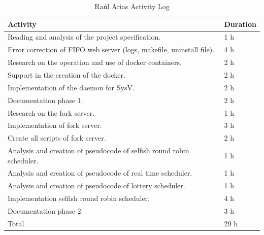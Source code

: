 \documentclass{article}
\begin{document}
\begin{table}[H]
\centering
\caption{Raúl Arias Activity Log}
\begin{tabular}{|p{7cm}|p{7cm}|}
\hline
\textbf{Activity} & \textbf{Duration} \\ \hline
Reading and analysis of the project specification. & 1 h \\ \hline 
Error correction of FIFO web server (logs, makefile, uninstall file). & 4 h  \\ \hline
Research on the operation and use of docker containers. & 2 h \\ \hline
Support in the creation of the docker. & 2 h \\ \hline
Implementation of the daemon for SysV. & 2 h \\ \hline
Documentation phase 1. & 2 h\\ \hline
Research on the fork server. & 1 h\\ \hline
Implementation of fork server. & 3 h\\ \hline
Create all scripts of fork server. & 2 h\\ \hline
Analysis and creation of pseudocode of selfish round robin scheduler. & 1 h\\ \hline
Analysis and creation of pseudocode of real time scheduler. & 1 h\\ \hline
Analysis and creation of pseudocode of lottery scheduler. & 1 h\\ \hline
Implementation selfish round robin scheduler. & 4 h\\ \hline
Documentation phase 2. & 3 h\\ \hline
Total & 29 h \\ \hline
\end{tabular}
\end{table}
\end{document}
